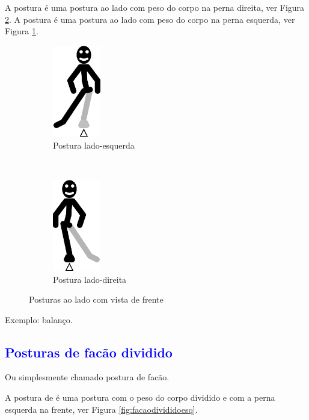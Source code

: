 A postura  é uma postura ao lado com peso do corpo na perna direita, ver Figura \ref{fig:ladodireita}.
A postura  é uma postura ao lado com peso do corpo na perna esquerda, ver Figura \ref{fig:ladoesquerda}.
\begin{figure}[H]
    \centering
    \begin{subfigure}[b]{0.3\textwidth}
        \includegraphics[height=4cm]{chapters/cap-partituramov-posturas/postura-lateral-esq.eps}
        \caption{Postura lado-esquerda}
        \label{fig:ladoesquerda}
    \end{subfigure}
    ~ %
    \begin{subfigure}[b]{0.3\textwidth}
        \includegraphics[height=4cm]{chapters/cap-partituramov-posturas/postura-lateral-der.eps}
        \caption{Postura lado-direita}
        \label{fig:ladodireita}
    \end{subfigure}      
    \caption{Posturas ao lado  com vista de frente}\label{fig:ladoderesq}
\end{figure}


Exemplo: balanço.

\subsection{\textcolor{blue}{ Posturas de facão dividido}}
Ou simplesmente chamado postura de facão.

A postura  de  é uma postura com o peso do corpo dividido e com a perna esquerda na frente, ver Figura \ref{fig:facaodivididoesq}.

